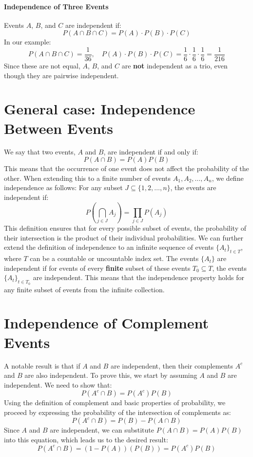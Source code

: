     \paragraph{Independence of Three Events}
    Events $A$, $B$, and $C$ are independent if:
    \[
    {P}(A \cap B \cap C) = {P}(A) \cdot {P}(B) \cdot {P}(C)
    \]
    In our example:
    \[
    {P}(A \cap B \cap C) = \frac{1}{36}, \quad {P}(A) \cdot {P}(B) \cdot {P}(C) = \frac{1}{6} \cdot \frac{1}{6} \cdot \frac{1}{6} = \frac{1}{216}
    \]
    Since these are not equal, $A$, $B$, and $C$ are \textbf{not} independent as a trio, even though they are pairwise independent.

    \section{General case: Independence Between Events}
    We say that two events, \( A \) and \( B \), are independent if and only if:
    \[
    P(A \cap B) = P(A)P(B)
    \]
    This means that the occurrence of one event does not affect the probability of the other. When extending this to a finite number of events \( A_1, A_2, \dots, A_n \), we define independence as follows:
    For any subset \( J \subseteq \{1, 2, \dots, n\} \), the events are independent if:
    \[
    P\left(\bigcap_{j \in J} A_j \right) = \prod_{j \in J} P(A_j)
    \]
    This definition ensures that for every possible subset of events, the probability of their intersection is the product of their individual probabilities. \newline
    We can further extend the definition of independence to an infinite sequence of events \( \{A_t\}_{t \in T} \), where \( T \) can be a countable or uncountable index set. The events \( \{A_t\} \) are independent if for events of every \textbf{finite} subset of these events \( T_0 \subseteq T \), the events \( \{A_t\}_{t \in T_0} \) are independent. This means that the independence property holds for any finite subset of events from the infinite collection.
    
    \section{Independence of Complement Events}
    A notable result is that if \( A \) and \( B \) are independent, then their complements \( A^c \) and \( B \) are also independent. To prove this, we start by assuming \( A \) and \( B \) are independent. We need to show that:
    \[
    P(A^c \cap B) = P(A^c)P(B)
    \]
    Using the definition of complement and basic properties of probability, we proceed by expressing the probability of the intersection of complements as:
    \[
    P(A^c \cap B) = P(B) - P(A \cap B)
    \]
    Since \( A \) and \( B \) are independent, we can substitute \( P(A \cap B) = P(A)P(B) \) into this equation, which leads us to the desired result:
    \[
    P(A^c \cap B) = (1 - P(A))(P(B)) = P(A^c)P(B)
    \]
    
